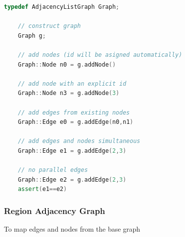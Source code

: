     \begin{minipage}{\textwidth}\vspace{-0.75cm}\begin{lstlisting}[language=c++]
    typedef AdjacencyListGraph Graph;

    // construct graph
    Graph g;

    // add nodes (id will be asigned automatically)
    Graph::Node n0 = g.addNode() 

    // add node with an explicit id
    Graph::Node n3 = g.addNode(3)

    // add edges from existing nodes
    Graph::Edge e0 = g.addEdge(n0,n1)

    // add edges and nodes simultaneous 
    Graph::Edge e1 = g.addEdge(2,3)

    // no parallel edges 
    Graph::Edge e2 = g.addEdge(2,3)
    assert(e1==e2)  
    \end{lstlisting}\end{minipage}\vspace{0.5cm}



\subsubsection{Region Adjacency Graph} \label{sec:graphs_rag}








To map edges and nodes from the base graph


